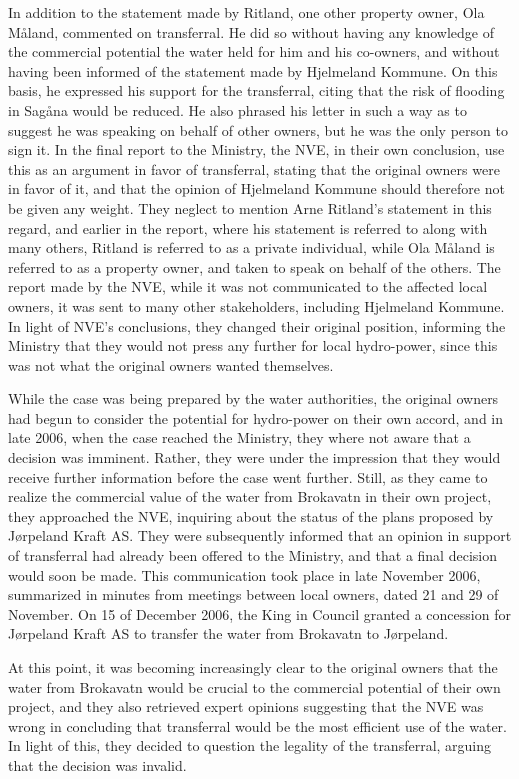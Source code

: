 In addition to the statement made by Ritland, one other property owner, Ola Måland, commented on transferral. He did so without having any knowledge of the commercial potential the water held for him and his co-owners, and without having been informed of the statement made by Hjelmeland Kommune. On this basis, he expressed his support for the transferral, citing that the risk of flooding in Sagåna would be reduced. He also phrased his letter in such a way as to suggest he was speaking on behalf of other owners, but he was the only person to sign it. In the final report to the Ministry, the NVE, in their own conclusion, use this as an argument in favor of transferral, stating that the original owners were in favor of it, and that the opinion of Hjelmeland Kommune should therefore not be given any weight. They neglect to mention Arne Ritland's statement in this regard, and earlier in the report, where his statement is referred to along with many others, Ritland is referred to as a private individual, while Ola Måland is referred to as a property owner, and taken to speak on behalf of the others. The report made by the NVE, while it was not communicated to the affected local owners, it was sent to many other stakeholders, including Hjelmeland Kommune. In light of NVE's conclusions, they changed their original position, informing the Ministry that they would not press any further for local hydro-power, since this was not what the original owners wanted themselves. 

While the case was being prepared by the water authorities, the original owners had begun to consider the potential for hydro-power on their own accord, and in late 2006, when the case reached the Ministry, they where not aware that a decision was imminent. Rather, they were under the impression that they would receive further information before the case went further. Still, as they came to realize the commercial value of the water from Brokavatn in their own project, they approached the NVE, inquiring about the status of the plans proposed by Jørpeland Kraft AS. They were subsequently informed that an opinion in support of transferral had already been offered to the Ministry, and that a final decision would soon be made. This communication took place in late November 2006, summarized in minutes from meetings between local owners, dated 21 and 29 of November. On 15 of December 2006, the King in Council granted a concession for Jørpeland Kraft AS to transfer the water from Brokavatn to Jørpeland.

At this point, it was becoming increasingly clear to the original owners that the water from Brokavatn would be crucial to the commercial potential of their own project, and they also retrieved expert opinions suggesting that the NVE was wrong in concluding that transferral would be the most efficient use of the water. In light of this, they decided to question the legality of the transferral, arguing that the decision was invalid.

